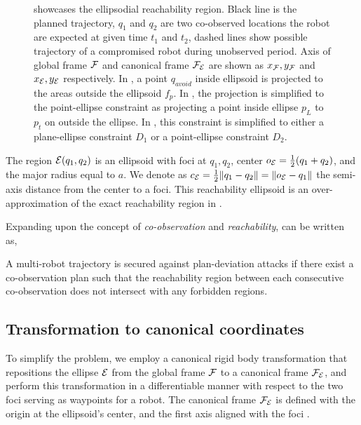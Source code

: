 \documentclass[10pt,twocolumn,twoside]{IEEEtran}
\begin{document}
\begin{figure}
    \caption{  showcases the ellipsodial reachability region. Black line is the planned trajectory, $q_1$ and $q_2$ are two co-observed locations the robot are expected at given time $t_1$ and $t_2$, dashed lines show possible trajectory of a compromised robot during unobserved period. Axis of global frame $\mathcal{F}$ and canonical frame $\mathcal{F}_{\mathcal{E}}$ are shown as $x_{\mathcal{F}}, y_{\mathcal{F}}$ and $x_{\mathcal{E}}, y_{\mathcal{E}}$ respectively. 
    In , a point $q_{avoid}$ inside ellipsoid is projected to the areas outside the ellipsoid $f_{p}$. 
    In , the projection is simplified to the point-ellipse constraint as projecting a point inside ellipse $p_{L}$ to $p_{t}$ on outside the ellipse.
    In , this constraint is simplified to either a plane-ellipse constraint $D_{1}$ or a point-ellipse constraint $D_{2}$.}
    \label{fig:Reachability_full}
  \end{figure}

The region $\mathcal{E}(q_1,q_2)$ is an ellipsoid with foci at $q_1,q_2$, center $o_{\mathcal{E}} = \frac{1}{2}(q_1+q_2)$, and the major radius equal to $a$. We denote as $c_{\mathcal{E}}=\frac{1}{2}\lVert q_1-q_2\rVert=\lVert o_{\mathcal{E}}-q_1\rVert$ the semi-axis distance from the center to a foci. This reachability ellipsoid is an over-approximation of the exact reachability region in .

Expanding upon the concept of \emph{co-observation} and \emph{reachability},  can be written as,
\begin{remark}\label{rmk:revised-security}
  A multi-robot trajectory is secured against plan-deviation attacks if there exist a co-observation plan such that the reachability region between each consecutive co-observation does not intersect with any forbidden regions.
\end{remark}

\subsection{Transformation to canonical coordinates}\label{sec:rotation2Standard}
To simplify the problem, we employ a canonical rigid body transformation that repositions the ellipse $\mathcal{E}$ from the global frame $\mathcal{F}$ to a canonical frame $\mathcal{F}_{\mathcal{E}}$, and perform this transformation in a differentiable manner with respect to the two foci serving as waypoints for a robot. The canonical frame $\mathcal{F}_{\mathcal{E}}$ is defined with the origin at the ellipsoid's center, and the first axis aligned with the foci . 
\end{document}
